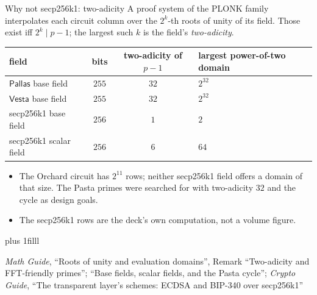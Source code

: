 \documentclass[aspectratio=169,11pt]{beamer}
\newcommand{\Pallas}{\ensuremath{\mathsf{Pallas}}}
\newcommand{\Vesta}{\ensuremath{\mathsf{Vesta}}}
\newcommand{\src}[1]{\par\vskip0pt plus 1filll
  {\fontsize{6}{7.2}\selectfont\color{arbdim}\raggedright #1\par}}
\begin{document}
\begin{frame}{Why not secp256k1: two-adicity}
A proof system of the PLONK family interpolates each circuit column over
the $2^{k}$-th roots of unity of its field. Those exist iff
$2^{k} \mid p - 1$; the largest such $k$ is the field's \emph{two-adicity}.
\begin{center}\small
\begin{tabular}{@{}lccl@{}}
\toprule
field & bits & two-adicity of $p - 1$ & largest power-of-two domain \\
\midrule
\Pallas{} base field & $255$ & $32$ & $2^{32}$ \\
\Vesta{} base field & $255$ & $32$ & $2^{32}$ \\
secp256k1 base field & $256$ & $1$ & $2$ \\
secp256k1 scalar field & $256$ & $6$ & $64$ \\
\bottomrule
\end{tabular}
\end{center}
\begin{itemize}
  \item The Orchard circuit has $2^{11}$ rows; neither secp256k1 field
    offers a domain of that size. The Pasta primes were searched for with
    two-adicity $32$ and the cycle as design goals.
  \item The secp256k1 rows are the deck's own computation, not a volume
    figure.
\end{itemize}
\src{\emph{Math Guide}, ``Roots of unity and evaluation domains'', Remark
  ``Two-adicity and FFT-friendly primes''; ``Base fields, scalar fields, and
  the Pasta cycle''; \emph{Crypto Guide}, ``The transparent layer's schemes:
  ECDSA and BIP-340 over secp256k1''}
\end{frame}
\end{document}
